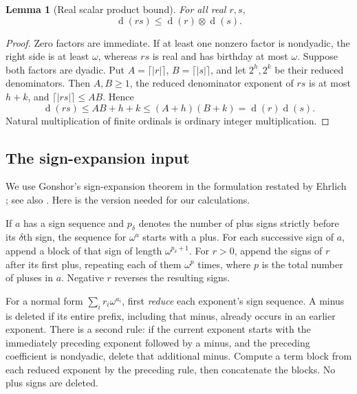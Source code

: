 \documentclass[11pt,letterpaper]{article}
\numberwithin{equation}{section}
\newtheorem{lemma}[theorem]{Lemma}
\theoremstyle{definition}
\theoremstyle{remark}
\newcommand{\rd}{\operatorname{d}}
\newcommand{\np}{\mathbin{\otimes}}
\begin{document}
\begin{lemma}[Real scalar product bound]\label{lem:realproduct}
For all real $r,s$,
\[
 \rd(rs)\leq\rd(r)\np\rd(s).
\]
\end{lemma}
\begin{proof}
Zero factors are immediate. If at least one nonzero factor is nondyadic, the
right side is at least $\omega$, whereas $rs$ is real and has birthday at most
$\omega$. Suppose both factors are dyadic. Put
$A=\lceil|r|\rceil$, $B=\lceil|s|\rceil$, and let $2^h,2^k$ be their reduced
denominators. Then $A,B\geq1$, the reduced denominator exponent of $rs$ is at
most $h+k$, and $\lceil|rs|\rceil\leq AB$. Hence
\[
 \rd(rs)\leq AB+h+k
 \leq(A+h)(B+k)=\rd(r)\rd(s).
\]
Natural multiplication of finite ordinals is ordinary integer multiplication.
\end{proof}

\subsection{The sign-expansion input}
We use Gonshor's sign-expansion theorem in the formulation restated by Ehrlich
\cite[Propositions~3.7--3.8]{Ehrlich2011}; see also
\cite[Definition~2.6 and Theorem~2.7]{BG2022}. Here is the version needed for our
calculations.

If $a$ has a sign sequence and $p_\delta$ denotes the number of plus signs
strictly before its $\delta$th sign, the sequence for $\omega^a$ starts with a
plus. For each successive sign of $a$, append a block of that sign of length
$\omega^{p_\delta+1}$. For $r>0$, append the signs of $r$ after its first plus,
repeating each of them $\omega^p$ times, where $p$ is the total number of pluses
in $a$. Negative $r$ reverses the resulting signs.

For a normal form $\sum_i r_i\omega^{a_i}$, first \emph{reduce} each exponent's
sign sequence. A minus is deleted if its entire prefix, including that minus,
already occurs in an earlier exponent. There is a second rule: if the current
exponent starts with the immediately preceding exponent followed by a minus,
and the preceding coefficient is nondyadic, delete that additional minus.
Compute a term block from each reduced exponent by the preceding rule, then
concatenate the blocks. No plus signs are deleted.
\end{document}
